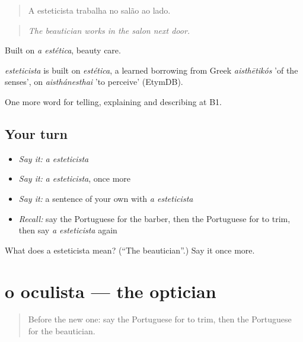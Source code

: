 \begin{quote}
A esteticista trabalha no salão ao lado.
\end{quote}

\begin{quote}
\emph{The beautician works in the salon next door.}
\end{quote}

Built on \emph{a estética}, beauty care.

\begin{cousinweb}
\emph{esteticista} is built on \emph{estética}, a learned borrowing from Greek \emph{aisthētikós} 'of the senses', on \emph{aisthánesthai} 'to perceive' (EtymDB).
\end{cousinweb}

\begin{grammarlens}[title={What you've built}]
One more word for telling, explaining and describing at B1.
\end{grammarlens}

\subsection*{Your turn}
\begin{itemize}
\raggedright
  \item \emph{Say it:} \emph{a esteticista}
  \item \emph{Say it:} \emph{a esteticista}, once more
  \item \emph{Say it:} a sentence of your own with \emph{a esteticista}
  \item \emph{Recall:} say the Portuguese for the barber, then the Portuguese for to trim, then say \emph{a esteticista} again
\end{itemize}

\begin{tcolorbox}[breakable,colback=teal!4,colframe=teal!35!black,title={Before you move on}]
What does a esteticista mean? (\textquotedblleft{}The beautician\textquotedblright{}.) Say it once more.
\end{tcolorbox}
\section[o oculista]{o oculista — the optician}

\label{lesson:PT-C452-oculista}



\begin{quote}
Before the new one: say the Portuguese for to trim, then the Portuguese for the beautician.
\end{quote}


